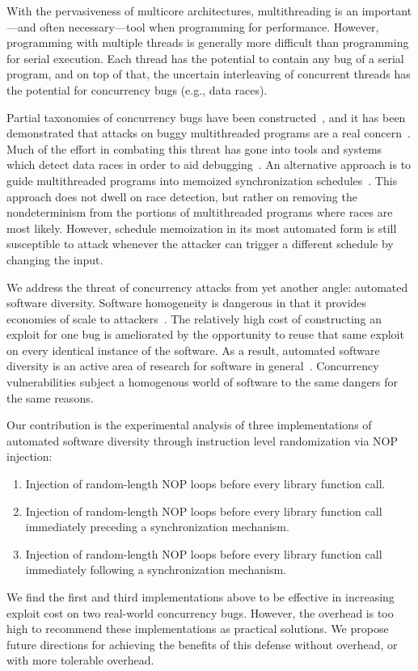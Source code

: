 With the pervasiveness of multicore architectures, multithreading is an
important---and often necessary---tool when programming for performance.
However, programming with multiple threads is generally more difficult than programming for serial execution.
Each thread has the potential to contain any bug of a serial program, and on
top of that, the uncertain interleaving of concurrent threads has the
potential for concurrency bugs (e.g., data races).

Partial taxonomies of concurrency bugs have been constructed~\cite{Farchi2003, Lu2008}, and it has been demonstrated that attacks on buggy multithreaded programs are a real concern~\cite{Yang2012}.
Much of the effort in combating this threat has gone into tools and systems which detect data races in order to aid debugging~\cite{Savage1997, Flanagan2004, Laadan2011, Pratikakis2011, Kasikci2013}.
An alternative approach is to guide multithreaded programs into memoized synchronization schedules~\cite{Cui2010}.
This approach does not dwell on race detection, but rather on removing the nondeterminism from the portions of multithreaded programs where races are most likely.
However, schedule memoization in its most automated form is still susceptible to attack whenever the attacker can trigger a different schedule by changing the input.

We address the threat of concurrency attacks from yet another angle: automated software diversity.
Software homogeneity is dangerous in that it provides economies of scale to attackers~\cite{Geer2003b}.
The relatively high cost of constructing an exploit for one bug is ameliorated by the opportunity to reuse that same exploit on every identical instance of the software.
As a result, automated software diversity is an active area of research for software in general~\cite{Larsen2014}.
Concurrency vulnerabilities subject a homogenous world of software to the same dangers for the same reasons.

Our contribution is the experimental analysis of three implementations of automated software diversity through instruction level randomization via NOP injection:
\begin{enumerate}
	\item Injection of random-length NOP loops before every library function call.
	\item Injection of random-length NOP loops before every library function call immediately preceding a synchronization mechanism.
	\item Injection of random-length NOP loops before every library function call immediately following a synchronization mechanism.
\end{enumerate}

We find the first and third implementations above to be effective in increasing exploit cost on two real-world concurrency bugs.
However, the overhead is too high to recommend these implementations as practical solutions.
We propose future directions for achieving the benefits of this defense without overhead, or with more tolerable overhead.
